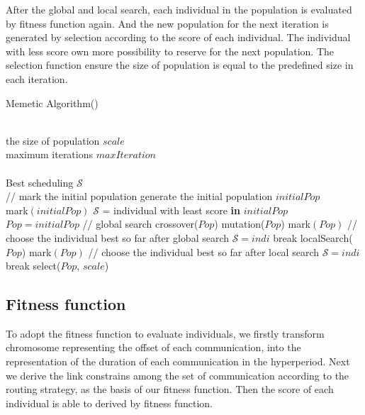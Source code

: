 \documentclass[conference]{IEEEtran}
\begin{document}
After the global and local search, each individual in the population is evaluated by fitness function again. And the new population for the next iteration is generated by selection according to the score of each individual. The individual with less score own more possibility to reserve for the next population. The selection function ensure the size of population is equal to the predefined size in each iteration.

\begin{algorithm}[tb]
	\caption{Memetic Algorithm()}
	\renewcommand{\algorithmicrequire}{\textbf{Input:}}
	\renewcommand{\algorithmicensure}{\textbf{Output:}}
	\begin{algorithmic}[1]
		\REQUIRE~~\\
		the size of population $scale$\\
		maximum iterations $maxIteration$\\
		\ENSURE~~\\
		Best scheduling $\mathcal{S}$\\
			\STATE // mark the initial population
				\STATE generate the	initial population $initialPop$\\
				\STATE mark$(initialPop)$
				\STATE $\mathcal{S}$ = individual with least score \textbf{in} $initialPop$
				\STATE $Pop = initialPop$
			\ELSE
			\STATE // global search
				\STATE crossover($Pop$)
				\STATE mutation($Pop$)
				\STATE mark$(Pop)$
			\ENDIF
			\STATE // choose the individual best so far after global search
					\STATE $\mathcal{S}=indi$
				\ENDIF
					\STATE break
				\ENDIF
			\ENDFOR	
			\STATE localSearch($Pop$)
			\STATE mark$(Pop)$
			\STATE // choose the individual best so far after local search
					\STATE $\mathcal{S}=indi$
				\ENDIF
					\STATE break
				\ENDIF
			\ENDFOR			
			\STATE select($Pop$, $scale$)
		\ENDFOR
	\end{algorithmic}
\end{algorithm}	

\subsection{Fitness function}

To adopt the fitness function to evaluate individuals, we firstly transform chromosome representing the offset of each communication, into the representation of the duration of each communication in the hyperperiod. Next we derive the link constrains among the set of communication according to the routing strategy, as the basis of our fitness function. Then the score of each individual is able to derived by fitness function.
\end{document}

